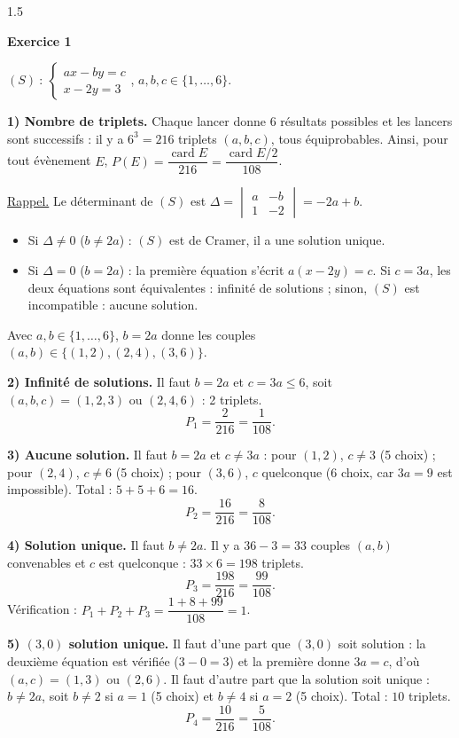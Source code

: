 \documentclass[12pt]{article}
\begin{document}
\begin{spacing}{1.5}

\textbf{Exercice 1}

$(S)\ :\ \begin{cases}ax-by=c\\x-2y=3\end{cases}$, \quad $a,b,c\in\{1,\dots,6\}$.

\textbf{1) Nombre de triplets.} Chaque lancer donne 6 résultats possibles et les lancers sont successifs : il y a $6^3=\boxed{216}$ triplets $(a,b,c)$, tous équiprobables. Ainsi, pour tout évènement $E$, $P(E)=\dfrac{\operatorname{card}E}{216}=\dfrac{\operatorname{card}E/2}{108}$.

\underline{Rappel.} Le déterminant de $(S)$ est $\Delta=\begin{vmatrix}a&-b\\1&-2\end{vmatrix}=-2a+b$.
\begin{itemize}
\item Si $\Delta\neq0$ ($b\neq2a$) : $(S)$ est de Cramer, il a une solution unique.
\item Si $\Delta=0$ ($b=2a$) : la première équation s'écrit $a(x-2y)=c$. Si $c=3a$, les deux équations sont équivalentes : infinité de solutions ; sinon, $(S)$ est incompatible : aucune solution.
\end{itemize}
Avec $a,b\in\{1,\dots,6\}$, $b=2a$ donne les couples $(a,b)\in\{(1,2),(2,4),(3,6)\}$.

\textbf{2) Infinité de solutions.} Il faut $b=2a$ et $c=3a\le6$, soit $(a,b,c)=(1,2,3)$ ou $(2,4,6)$ : 2 triplets.
\[
P_1=\frac{2}{216}=\boxed{\frac{1}{108}}.
\]

\textbf{3) Aucune solution.} Il faut $b=2a$ et $c\neq3a$ : pour $(1,2)$, $c\neq3$ (5 choix) ; pour $(2,4)$, $c\neq6$ (5 choix) ; pour $(3,6)$, $c$ quelconque (6 choix, car $3a=9$ est impossible). Total : $5+5+6=16$.
\[
P_2=\frac{16}{216}=\boxed{\frac{8}{108}}.
\]

\textbf{4) Solution unique.} Il faut $b\neq2a$. Il y a $36-3=33$ couples $(a,b)$ convenables et $c$ est quelconque : $33\times6=198$ triplets.
\[
P_3=\frac{198}{216}=\boxed{\frac{99}{108}}.
\]
Vérification : $P_1+P_2+P_3=\dfrac{1+8+99}{108}=1$.

\textbf{5) $(3,0)$ solution unique.} Il faut d'une part que $(3,0)$ soit solution : la deuxième équation est vérifiée ($3-0=3$) et la première donne $3a=c$, d'où $(a,c)=(1,3)$ ou $(2,6)$. Il faut d'autre part que la solution soit unique : $b\neq2a$, soit $b\neq2$ si $a=1$ (5 choix) et $b\neq4$ si $a=2$ (5 choix). Total : $10$ triplets.
\[
P_4=\frac{10}{216}=\boxed{\frac{5}{108}}.
\]


\end{spacing}
\end{document}
